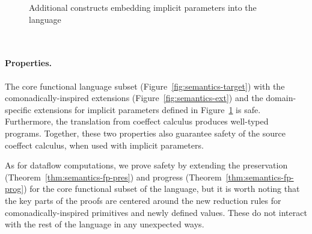 \begin{figure}[h!]
\vspace{-0.5em}
\caption{Additional constructs embedding implicit parameters into the language}
\label{fig:semantics-ext-impl}
\end{figure}


\newpage
~
\newpage
\paragraph{Properties.}

The core functional language subset (Figure~\ref{fig:semantics-target}) with the comonadically-inspired 
extensions (Figure~\ref{fig:semantics-ext}) and the domain-specific extensions for implicit 
parameters defined in Figure~\ref{fig:semantics-ext-impl} is safe. Furthermore, the 
translation from coeffect calculus produces well-typed programs. Together, these two properties 
also guarantee safety of the source coeffect calculus, when used with implicit parameters.


As for dataflow computations, we prove safety by extending the preservation
(Theorem~\ref{thm:semantics-fp-pres}) and progress (Theorem~\ref{thm:semantics-fp-prog})
for the core functional subset of the language, but it is worth noting that the key parts of
the proofs are centered around the new reduction rules for comonadically-inspired primitives
and newly defined  values. These do not interact with the rest of the language in 
any unexpected ways.


